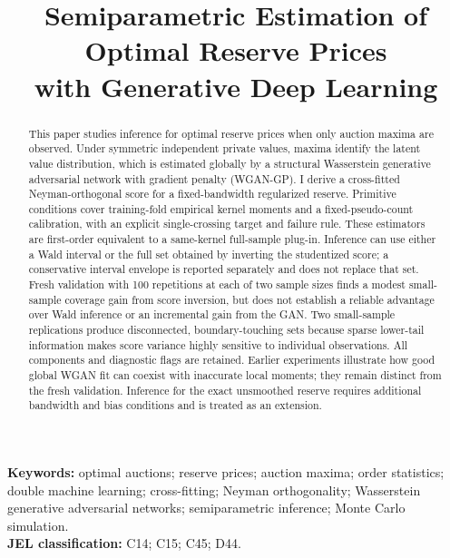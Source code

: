 \documentclass[12pt]{article}
\title{Semiparametric Estimation of Optimal Reserve Prices\\
with Generative Deep Learning}
\author{\paperdisplayauthor}
\date{\paperdate}
\begin{document}
\maketitle

\begin{abstract}
This paper studies inference for optimal reserve prices when only auction maxima
are observed. Under symmetric independent private values, maxima identify the
latent value distribution, which is estimated globally by a structural
Wasserstein generative adversarial network with gradient penalty (WGAN-GP).
I derive a cross-fitted Neyman-orthogonal score for a fixed-bandwidth regularized
reserve. Primitive conditions cover training-fold empirical kernel moments and
a fixed-pseudo-count calibration, with an explicit single-crossing target and
failure rule. These estimators are first-order equivalent to a same-kernel
full-sample plug-in. Inference can use either a Wald interval or the full set
obtained by inverting the studentized score; a conservative interval envelope
is reported separately and does not replace that set. Fresh validation with
100 repetitions at each of two sample sizes finds a modest small-sample
coverage gain from score inversion, but does not establish a reliable advantage
over Wald inference or an incremental gain from the GAN. Two small-sample
replications produce disconnected, boundary-touching sets because sparse
lower-tail information makes score variance highly sensitive to individual
observations. All components and diagnostic flags are retained. Earlier
experiments illustrate how good global WGAN fit can coexist with inaccurate
local moments; they remain distinct from the fresh validation. Inference for
the exact unsmoothed reserve requires additional bandwidth and bias conditions
and is treated as an extension.
\end{abstract}

\noindent\textbf{Keywords:} optimal auctions; reserve prices; auction maxima;
order statistics; double machine learning; cross-fitting; Neyman orthogonality;
Wasserstein generative adversarial networks; semiparametric inference; Monte
Carlo simulation.\\
\textbf{JEL classification:} C14; C15; C45; D44.












\appendix




\end{document}
